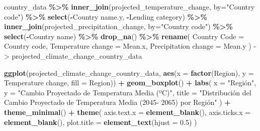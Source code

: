 \documentclass[
]{book}
\newenvironment{Shaded}{\begin{snugshade}}{\end{snugshade}}
\newcommand{\AttributeTok}[1]{\textcolor[rgb]{0.13,0.29,0.53}{#1}}
\newcommand{\FloatTok}[1]{\textcolor[rgb]{0.00,0.00,0.81}{#1}}
\newcommand{\FunctionTok}[1]{\textcolor[rgb]{0.13,0.29,0.53}{\textbf{#1}}}
\newcommand{\NormalTok}[1]{#1}
\newcommand{\OtherTok}[1]{\textcolor[rgb]{0.56,0.35,0.01}{#1}}
\newcommand{\SpecialCharTok}[1]{\textcolor[rgb]{0.81,0.36,0.00}{\textbf{#1}}}
\newcommand{\StringTok}[1]{\textcolor[rgb]{0.31,0.60,0.02}{#1}}
\begin{document}
\begin{Shaded}
\begin{Highlighting}[]
\NormalTok{country\_data }\SpecialCharTok{\%\textgreater{}\%} 
  \FunctionTok{inner\_join}\NormalTok{(projected\_temperature\_change, }\AttributeTok{by=}\StringTok{"Country code"}\NormalTok{) }\SpecialCharTok{\%\textgreater{}\%} 
  \FunctionTok{select}\NormalTok{(}\SpecialCharTok{{-}}\StringTok{\textasciigrave{}}\AttributeTok{Country name.y}\StringTok{\textasciigrave{}}\NormalTok{, }\SpecialCharTok{{-}}\StringTok{\textasciigrave{}}\AttributeTok{Lending category}\StringTok{\textasciigrave{}}\NormalTok{) }\SpecialCharTok{\%\textgreater{}\%} 
  \FunctionTok{inner\_join}\NormalTok{(projected\_precipitation\_change, }\AttributeTok{by=}\StringTok{"Country code"}\NormalTok{) }\SpecialCharTok{\%\textgreater{}\%} 
  \FunctionTok{select}\NormalTok{(}\SpecialCharTok{{-}}\StringTok{\textasciigrave{}}\AttributeTok{Country name}\StringTok{\textasciigrave{}}\NormalTok{) }\SpecialCharTok{\%\textgreater{}\%} 
  \FunctionTok{drop\_na}\NormalTok{() }\SpecialCharTok{\%\textgreater{}\%} 
    \FunctionTok{rename}\NormalTok{(}
    \StringTok{\textasciigrave{}}\AttributeTok{Country Code}\StringTok{\textasciigrave{}} \OtherTok{=} \StringTok{\textasciigrave{}}\AttributeTok{Country code}\StringTok{\textasciigrave{}}\NormalTok{,}
    \StringTok{\textasciigrave{}}\AttributeTok{Temperature change}\StringTok{\textasciigrave{}} \OtherTok{=}\NormalTok{ Mean.x,}
    \StringTok{\textasciigrave{}}\AttributeTok{Precipitation change}\StringTok{\textasciigrave{}} \OtherTok{=}\NormalTok{ Mean.y}
\NormalTok{  ) }\OtherTok{{-}\textgreater{}}\NormalTok{ projected\_climate\_change\_country\_data}
\end{Highlighting}
\end{Shaded}

\begin{Shaded}
\begin{Highlighting}[]
\FunctionTok{ggplot}\NormalTok{(projected\_climate\_change\_country\_data, }\FunctionTok{aes}\NormalTok{(}\AttributeTok{x =} \FunctionTok{factor}\NormalTok{(}\StringTok{\textasciigrave{}}\AttributeTok{Region}\StringTok{\textasciigrave{}}\NormalTok{), }\AttributeTok{y =} \StringTok{\textasciigrave{}}\AttributeTok{Temperature change}\StringTok{\textasciigrave{}}\NormalTok{, }\AttributeTok{fill =} \StringTok{\textasciigrave{}}\AttributeTok{Region}\StringTok{\textasciigrave{}}\NormalTok{)) }\SpecialCharTok{+}
  \FunctionTok{geom\_boxplot}\NormalTok{() }\SpecialCharTok{+}
  \FunctionTok{labs}\NormalTok{(}
    \AttributeTok{x =} \StringTok{"Región"}\NormalTok{,}
    \AttributeTok{y =} \StringTok{"Cambio Proyectado de Temperatura Media (ºC)"}\NormalTok{,}
    \AttributeTok{title =} \StringTok{"Distribución del Cambio Proyectado de Temperatura Media (2045{-} 2065) por Región"}
\NormalTok{  ) }\SpecialCharTok{+}
  \FunctionTok{theme\_minimal}\NormalTok{() }\SpecialCharTok{+}
  \FunctionTok{theme}\NormalTok{(}
    \AttributeTok{axis.text.x =} \FunctionTok{element\_blank}\NormalTok{(),  }
    \AttributeTok{axis.ticks.x =} \FunctionTok{element\_blank}\NormalTok{(),}
    \AttributeTok{plot.title =} \FunctionTok{element\_text}\NormalTok{(}\AttributeTok{hjust =} \FloatTok{0.5}\NormalTok{) }
\NormalTok{  )}
\end{Highlighting}
\end{Shaded}
\end{document}
